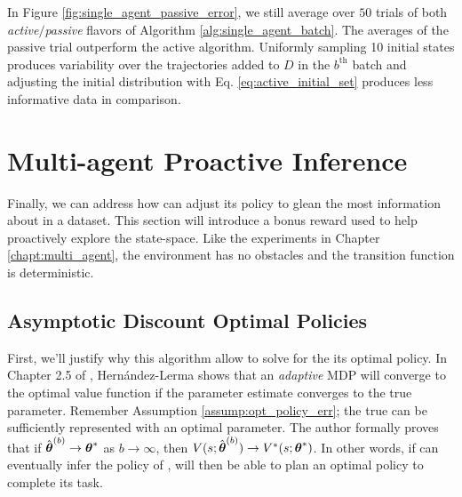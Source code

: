 \begin{figure}[htb]
	\begin{center}
	\end{center}
\end{figure}

In Figure \ref{fig:single_agent_passive_error}, we still average over $50$ trials of both \emph{active}$/$\emph{passive} flavors of Algorithm \ref{alg:single_agent_batch}. The averages of the passive trial outperform the active algorithm. Uniformly sampling 10 initial states produces variability over the trajectories added to $D$ in the $b^\text{th}$ batch and adjusting the initial distribution with Eq. \ref{eq:active_initial_set} produces less informative data in comparison.



\section{Multi-agent Proactive Inference}

Finally, we can address how  can adjust its policy to glean the most information about  in a dataset. This section will introduce a bonus reward used to help  proactively explore the state-space. Like the experiments in Chapter \ref{chapt:multi_agent}, the environment has no obstacles and the transition function is deterministic.

\subsection{Asymptotic Discount Optimal Policies}\label{sec:ADO_policy}

First, we'll justify why this algorithm allow  to solve for the its optimal policy. In Chapter 2.5 of \cite{hernandez2012adaptive}, Hern\'andez-Lerma shows that an \textit{adaptive}  \ac{MDP} will
converge to the optimal value function if the parameter estimate converges to the true parameter. Remember Assumption \ref{assump:opt_policy_err}; the true  can be
sufficiently represented with an optimal parameter.  The author formally proves that if $\hat{\boldsymbol{\mathbb{\theta}}}^{(b)}
\rightarrow \boldsymbol{\mathbb{\theta}}^*$ as $b \rightarrow \infty$, then $V(s;\hat{\boldsymbol{\mathbb{\theta}}}^{(b)}) \rightarrow
V^*(s;\boldsymbol{\mathbb{\theta}}^*)$. In other words, if  can eventually infer the policy of ,  will then be able to plan an optimal policy to complete its task. 


